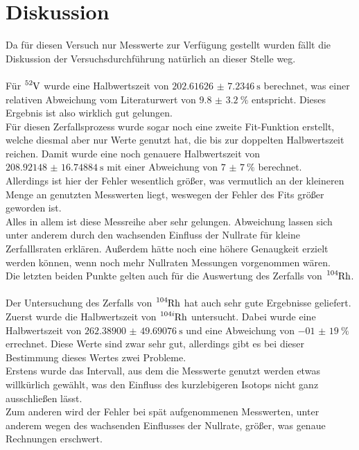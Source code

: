 \newpage
\section{Diskussion}
Da für diesen Versuch nur Messwerte zur Verfügung gestellt wurden fällt die Diskussion der Versuchsdurchführung natürlich an dieser Stelle weg.\\\\
Für $\ce{^{52}_{}V}$ wurde eine Halbwertszeit von $\SI{202.61626(723460)}{\second}$ berechnet, was einer relativen Abweichung vom Literaturwert von 
$\SI{9.8(32)}{\percent}$ entspricht. Dieses Ergebnis ist also wirklich gut gelungen.\\
Für diesen Zerfallsprozess wurde sogar noch eine zweite Fit-Funktion erstellt, welche diesmal aber nur Werte genutzt hat, die bis zur doppelten Halbwertszeit reichen.
Damit wurde eine noch genauere Halbwertszeit von $\SI{208.92148(1674884)}{\second}$ mit einer Abweichung von $\SI{7(7)}{\percent}$ berechnet.\\
Allerdings ist hier der Fehler wesentlich größer, was vermutlich an der kleineren Menge an genutzten Messwerten liegt, weswegen der Fehler des Fits größer geworden ist.\\
Alles in allem ist diese Messreihe aber sehr gelungen. Abweichung lassen sich unter anderem durch den wachsenden Einfluss der Nullrate für kleine Zerfalllsraten erklären.
Außerdem hätte noch eine höhere Genaugkeit erzielt werden können, wenn noch mehr Nullraten Messungen vorgenommen wären.\\
Die letzten beiden Punkte gelten auch für die Auswertung des Zerfalls von $\ce{^{104}_{}Rh}$.\\\\
Der Untersuchung des Zerfalls von $\ce{^{104}_{}Rh}$ hat auch sehr gute Ergebnisse geliefert.\\
Zuerst wurde die Halbwertszeit von $\ce{^{104i}_{}Rh}$ untersucht. Dabei wurde eine Halbwertszeit von $\SI{262.38900(4969076)}{\second}$ und eine Abweichung von $\SI{-01(19)}{\percent}$ errechnet. 
Diese Werte sind zwar sehr gut, allerdings gibt es bei dieser Bestimmung dieses Wertes zwei Probleme.\\
Erstens wurde das Intervall, aus dem die Messwerte genutzt werden etwas willkürlich gewählt, was den Einfluss des kurzlebigeren Isotops nicht ganz ausschließen lässt.\\
Zum anderen wird der Fehler bei spät aufgenommenen Messwerten, unter anderem wegen des wachsenden Einflusses der Nullrate, größer, was genaue Rechnungen erschwert.
